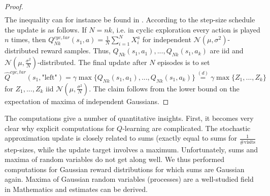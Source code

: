 \documentclass{article}
\newcommand{\E}{\mathbb{E}}
\theoremstyle{plain}
\newtheorem{proposition}[theorem]{Proposition}
\theoremstyle{definition}
\theoremstyle{remark}
\begin{document}
\begin{proof}
\begin{align*}
\end{align*}
The inequality can for instance be found in \cite{vH}. According to the step-size schedule the update is as follows. If $N=nk$, i.e. in cyclic exploration every action is played $n$ times, then $Q^{cyc,tar}_{Nk}(s_1,a)=\frac{1}{N} \sum_{i=1}^N X_i^a$ for independent $\mathcal N(\mu,\sigma^2)$-distributed reward samples. Thus, $Q_{Nk}(s_1,a_1),...,Q_{Nk}(s_1,a_k)$ are iid and $\mathcal N(\mu,\frac{\sigma^2}{N})$-distributed. The final update after $N$ episodes is to set $$\hat Q^{cyc,tar}(s_1,\text{"left"})= \gamma \max \{Q_{Nk}(s_1,a_1),...,Q_{Nk}(s_1,a_k)\}\overset{(d)}{=} \gamma \max \{Z_1,...,Z_k\}$$ 
for $Z_1,...,Z_k$ iid $\mathcal N(\mu,\frac{\sigma^2}{N})$. The claim follows from the lower bound on the expectation of maxima of independent Gaussians.
\end{proof}

The computations give a number of quantitative insights. First, it becomes very clear why explicit computations for $Q$-learning are complicated. The stochastic approximation update is closely related to sums (exactly equal to sums for $\frac{1}{\# \text{visits}}$  step-sizes, while the update target involves a maximum. Unfortunately, sums and maxima of random variables do not get along well. We thus performed computations for Gaussian reward distributions for which sums are Gaussian again. Maxima of Gaussian random variables (processes) are a well-studied field in Mathematics and estimates can be derived. 
\end{document}

